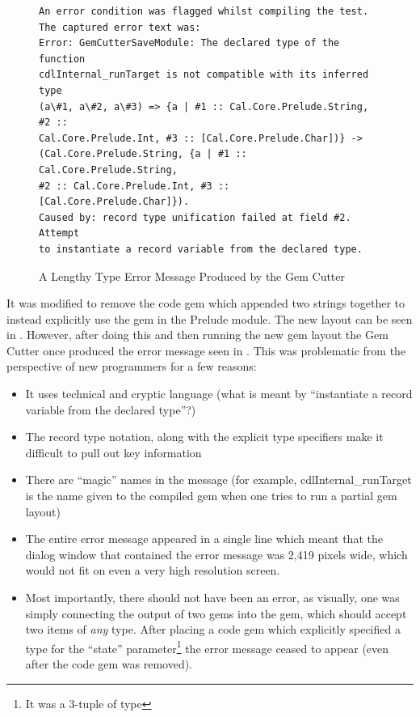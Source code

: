 \begin{figure}[htp]
  \begin{center}
\begin{verbatim}
An error condition was flagged whilst compiling the test.
The captured error text was:
Error: GemCutterSaveModule: The declared type of the function 
cdlInternal_runTarget is not compatible with its inferred type 
(a\#1, a\#2, a\#3) => {a | #1 :: Cal.Core.Prelude.String, #2 :: 
Cal.Core.Prelude.Int, #3 :: [Cal.Core.Prelude.Char])} -> 
(Cal.Core.Prelude.String, {a | #1 :: Cal.Core.Prelude.String, 
#2 :: Cal.Core.Prelude.Int, #3 :: [Cal.Core.Prelude.Char]}). 
Caused by: record type unification failed at field #2. Attempt 
to instantiate a record variable from the declared type.
\end{verbatim}
\end{center}
  \caption{A Lengthy Type Error Message Produced by the Gem Cutter}
  \label{fig:longErrMsg}
\end{figure}

It was modified to remove the code gem which appended two strings together to instead explicitly use the  gem in the Prelude module.  The new layout can be seen in .  However, after doing this and then running the new gem layout the Gem Cutter once produced the error message seen in .  This was problematic from the perspective of new programmers for a few reasons:

\begin{itemize}
	\item It uses technical and cryptic language (what is meant by ``instantiate a record variable from the declared type''?)
	\item The record type notation, along with the explicit type specifiers make it difficult to pull out key information
	\item There are ``magic'' names in the message (for example, cdlInternal\_runTarget is the name given to the compiled gem when one tries to run a partial gem layout)
	\item The entire error message appeared in a single line which meant that the dialog window that contained the error message was 2,419 pixels wide, which would not fit on even a very high resolution screen.
	\item Most importantly, there should not have been an error, as visually, one was simply connecting the output of two gems into the  gem, which should accept two items of \emph{any} type.  After placing a code gem which explicitly specified a type for the ``state'' parameter\footnote{It was a 3-tuple of type } the error message ceased to appear (even after the code gem was removed).
\end{itemize}


